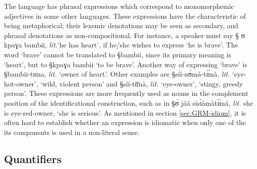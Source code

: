 The language has phrasal expressions which correspond to  monomorphemic
adjectives in some other languages. These expressions have the characteristic of
being metaphorical; their lexemic denotations may be seen as secondary, and
phrasal  denotations as non-compositional. For instance, a speaker must say {\S
ʊ kpaɣa bambii}, {\it lit.}`he has heart', if he/she wishes to express `he is
brave'. The word `brave' cannot be translated to {\S bambii}, since its primary
meaning is `heart',  but to {\S kpaɣa bambii}  `to be brave'. Another way of
expressing `brave'  is {\S bambii-tɪɪna}, {\it lit.} `owner of heart'. Other
examples  are {\S síí-nʊ̀mà-tɪ́ɪ́nà}, {\it lit.} `eye-hot-owner', `wild,
violent  person'   and {\S síí-tɪ̄ɪ̄nà}, {\it lit.} `eye-owner', `stingy,
greedy person'. These expressions are more frequently used as nouns in the
complement position of the identificational construction, such as in {\S ʊ̀
jáá sísɪ̀àmàtɪ̀ɪ̀ná}, {\it lit.} she is eye-red-owner, `she is serious'.
As mentioned in section \ref{sec:GRM-idiom},  it is often hard to establish
whether an expression is idiomatic when only one of the its components
is used in a non-literal sense.



% 
% 






\subsection{Quantifiers}
\label{sec:GRM-quantifier}


